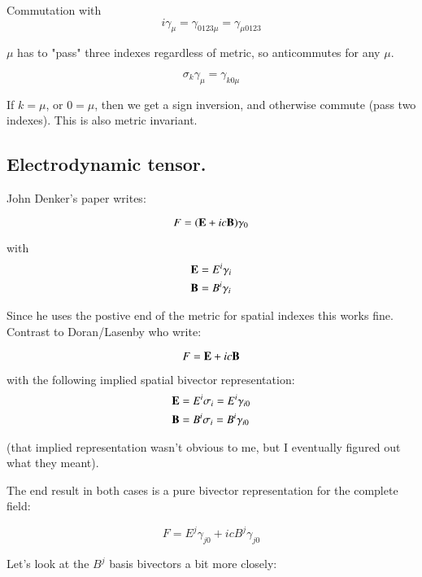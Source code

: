 \documentclass{article}
\begin{document}
Commutation with 
\begin{equation*}
i \gamma_{\mu} = \gamma_{0123\mu} = \gamma_{\mu0123}
\end{equation*}

$\mu$ has to "pass" three indexes regardless of metric, so anticommutes for any $\mu$.

\begin{equation*}
\sigma_k \gamma_{\mu} = \gamma_{k0\mu}
\end{equation*}

If $k = \mu$, or $0 = \mu$, then we get a sign inversion, and otherwise commute (pass two indexes).  This is also metric invariant.

\subsection{ Electrodynamic tensor. }

John Denker's paper writes:

\begin{equation*}
F = (\mathbf{E} + ic\mathbf{B}) \gamma_0
\end{equation*}

with
\begin{align*}
\mathbf{E} &= E^i \gamma_i \\
\mathbf{B} &= B^i \gamma_i
\end{align*}

Since he uses the postive end of the metric for spatial indexes this works fine.  Contrast to Doran/Lasenby who write:

\begin{equation*}
F = \mathbf{E} + ic\mathbf{B}
\end{equation*}

with the following implied spatial bivector representation:
\begin{align*}
\mathbf{E} &= E^i \sigma_i = E^i \gamma_{i0} \\
\mathbf{B} &= B^i \sigma_i = B^i \gamma_{i0}
\end{align*}

(that implied representation wasn't obvious to me, but I eventually figured out what they meant).

The end result in both cases is a pure bivector representation for the complete field:

\begin{equation*}
F = E^j \gamma_{j0} + icB^j \gamma_{j0}
\end{equation*}

Let's look at the $B^j$ basis bivectors a bit more closely:
\end{document}
